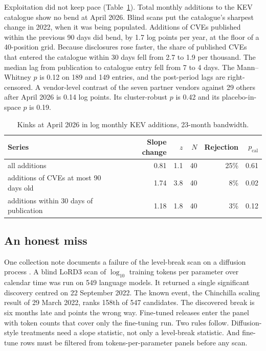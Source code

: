 \documentclass[11pt]{article}
\begin{document}
Exploitation did not keep pace (Table~\ref{tab:kev}). Total monthly additions to the KEV catalogue show no bend at April 2026. Blind scans put
the catalogue's sharpest change in 2022, when it was being populated. Additions of CVEs published within the previous 90
days did bend, by 1.7 log points per year, at the floor of a 40-position grid. Because
disclosures rose faster, the share of published CVEs that entered the catalogue within 30
days fell from 2.7 to 1.9 per thousand. The median lag from publication to catalogue entry fell from 7 to 4 days. The Mann--
Whitney $p$ is 0.12 on 189 and 149 entries, and the post-period lags are right-censored. A
vendor-level contrast of the seven partner vendors against 29 others after April 2026 is
0.14 log points. Its cluster-robust $p$ is 0.42 and its placebo-in-space $p$ is 0.19.

\begin{table}[t]
\centering
\small
\caption{Kinks at April 2026 in log monthly KEV additions, 23-month bandwidth.}
\label{tab:kev}
\begin{tabular}{@{}lrrrrr@{}}
\toprule
Series & Slope change & $z$ & $N$ & Rejection & $p_{\mathrm{cal}}$ \\
\midrule
all additions & 0.81 & 1.1 & 40 & 25\% & 0.61 \\
additions of CVEs at most 90 days old & 1.74 & 3.8 & 40 & 8\% & 0.02 \\
additions within 30 days of publication & 1.18 & 1.8 & 40 & 3\% & 0.12 \\
\bottomrule
\end{tabular}
\end{table}

\subsection{An honest miss}\label{sec:miss}

One collection note documents a failure of the level-break scan on a diffusion process
\cite{chinchillanote}. A blind LoRD3 scan of $\log_{10}$ training tokens per parameter over calendar time was run
on 549 language models. It returned a single significant discovery centred on 22 September
2022. The known event, the Chinchilla scaling result of 29 March
2022, ranks 158th of 547 candidates. The discovered break is six months late and points the wrong way. Fine-tuned releases
enter the panel with token counts that cover only the fine-tuning run. Two rules follow. Diffusion-style treatments need a slope
statistic, not only a level-break statistic. And fine-tune rows must be filtered from
tokens-per-parameter panels before any scan.
\end{document}
